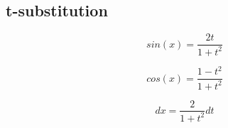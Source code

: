 

\subsection{t-substitution}

\[ sin(x) = \frac{2t}{1+t^2}\]        

\[ cos(x) = \frac{1-t^2}{1+t^2}\]

\[ dx =\frac{2}{1+t^2}dt \]

